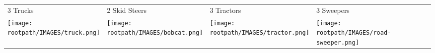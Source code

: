 \begin{tabular}{m{}m{}m{}m{}}
    {\color{ccorange} 3 Trucks} & {\color{ccorange} 2 Skid Steers} & {\color{ccorange} 3 Tractors} & {\color{ccorange} 3 Sweepers} \\
    \texttt{[image: \\rootpath/IMAGES/truck.png]}  & \texttt{[image: \\rootpath/IMAGES/bobcat.png]} & \texttt{[image: \\rootpath/IMAGES/tractor.png]} & \texttt{[image: \\rootpath/IMAGES/road-sweeper.png]}                         
    \end{tabular}